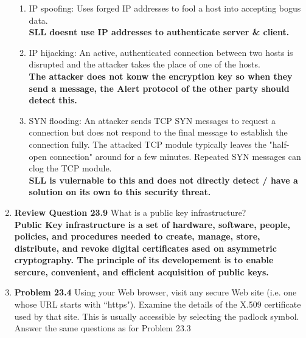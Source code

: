 \documentclass[12pt]{article}
\begin{document}
\begin{enumerate}
\begin{enumerate}
    \item IP spoofing: Uses forged IP addresses to fool a host into accepting bogus data.\\

    \textbf{SLL doesnt use IP addresses to authenticate server & client.} \\

    \item IP hijacking: An active, authenticated connection between two hosts is disrupted and the attacker takes the place of one of the hosts.\\

    \textbf{The attacker does not konw the encryption key so when they send a message, the Alert protocol of the other party should detect this.} \\

    \item SYN flooding: An attacker sends TCP SYN messages to request a connection but does not respond to the final message to establish the connection fully. The attacked TCP module typically leaves the "half-open connection" around for a few minutes. Repeated SYN messages can clog the TCP module.\\

    \textbf{SLL is vulernable to this and does not directly detect / have a solution on its own to this security threat.} \\

  \end{enumerate}

  \item \textbf{Review Question 23.9} What is a public key infrastructure?\\

  \textbf{Public Key infrastructure is a set of hardware, software, people, policies, and procedures needed to create, manage, store, distribute, and revoke digital certificates ased on asymmetric cryptography. The principle of its developement is to enable sercure, convenient, and efficient acquisition of public keys.} \\

  \item \textbf{Problem 23.4} Using your Web browser, visit any secure Web site (i.e. one whose URL starts with ``https"). Examine the details of the X.509 certificate used by that site. This is usually accessible by selecting the padlock symbol. Answer the same questions as for Problem 23.3 \\


\end{enumerate}
\end{document}
